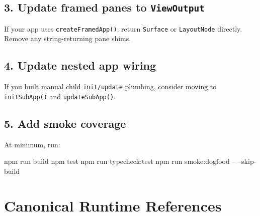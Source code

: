 \subsection{\texorpdfstring{3. Update framed panes to \texttt{V\allowbreak{}i\allowbreak{}e\allowbreak{}w\allowbreak{}O\allowbreak{}u\allowbreak{}t\allowbreak{}p\allowbreak{}u\allowbreak{}t}}{3. Update framed panes to }}\label{record-010-update-framed-panes-to-viewoutput}

If your app uses \texttt{c\allowbreak{}r\allowbreak{}e\allowbreak{}a\allowbreak{}t\allowbreak{}e\allowbreak{}F\allowbreak{}r\allowbreak{}a\allowbreak{}m\allowbreak{}e\allowbreak{}d\allowbreak{}A\allowbreak{}p\allowbreak{}p\allowbreak{}(\allowbreak{})}, return \texttt{S\allowbreak{}u\allowbreak{}r\allowbreak{}f\allowbreak{}a\allowbreak{}c\allowbreak{}e} or \texttt{L\allowbreak{}a\allowbreak{}y\allowbreak{}o\allowbreak{}u\allowbreak{}t\allowbreak{}N\allowbreak{}o\allowbreak{}d\allowbreak{}e} directly. Remove any string-returning pane shims.

\subsection{4. Update nested app wiring}\label{record-010-update-nested-app-wiring}

If you built manual child \texttt{i\allowbreak{}n\allowbreak{}i\allowbreak{}t\allowbreak{}/\allowbreak{}u\allowbreak{}p\allowbreak{}d\allowbreak{}a\allowbreak{}t\allowbreak{}e} plumbing, consider moving to \texttt{i\allowbreak{}n\allowbreak{}i\allowbreak{}t\allowbreak{}S\allowbreak{}u\allowbreak{}b\allowbreak{}A\allowbreak{}p\allowbreak{}p\allowbreak{}(\allowbreak{})} and \texttt{u\allowbreak{}p\allowbreak{}d\allowbreak{}a\allowbreak{}t\allowbreak{}e\allowbreak{}S\allowbreak{}u\allowbreak{}b\allowbreak{}A\allowbreak{}p\allowbreak{}p\allowbreak{}(\allowbreak{})}.

\subsection{5. Add smoke coverage}\label{record-010-add-smoke-coverage}

At minimum, run:

\begin{CodeBlock}
npm run build
npm test
npm run typecheck:test
npm run smoke:dogfood -- --skip-build
\end{CodeBlock}

\section{Canonical Runtime References}\label{record-010-canonical-runtime-references}

